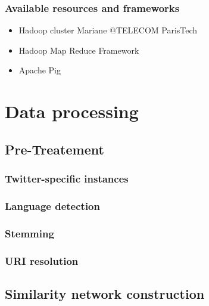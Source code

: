 \documentclass[handout]{beamer}
\begin{document}
\begin{frame}
\frametitle{\bf Available resources and frameworks}

\begin{itemize}
\item Hadoop cluster Mariane @TELECOM ParisTech
\item Hadoop Map Reduce Framework
\item Apache Pig
\end{itemize}

\end{frame}


\section{Data processing}

\subsection{Pre-Treatement}



\subsubsection{Twitter-specific instances}


\subsubsection{Language detection}


\subsubsection{Stemming}


\subsubsection{URI resolution}

\subsection{Similarity network construction}
\end{document}
